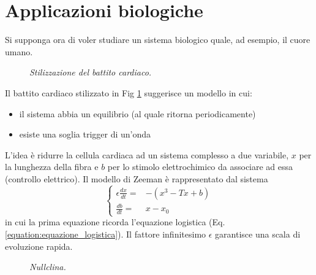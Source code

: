\documentclass[12pt, a4paper]{book}
\theoremstyle{theorem}
\begin{document}
		\section{Applicazioni biologiche}
			Si supponga ora di voler studiare un sistema biologico quale, ad esempio, il cuore umano.
			\begin{figure}[H]
				\centering
				\caption{\emph{Stilizzazione del battito cardiaco.}}
				\label{figure:battito_cardiaco}
			\end{figure}
			Il battito cardiaco stilizzato in Fig \ref{figure:battito_cardiaco} suggerisce un modello in cui:
			\begin{itemize}
				\item il sistema abbia un equilibrio (al quale ritorna periodicamente)
				\item esiste una soglia trigger di un'onda 
			\end{itemize}
			L'idea è ridurre la cellula cardiaca ad un sistema complesso a due variabile, $x$ per la lunghezza della fibra e $b$ per lo stimolo elettrochimico da associare ad essa (controllo elettrico).
			Il modello di Zeeman è rappresentato dal sistema
			\begin{equation}
				\begin{cases}
					\epsilon\frac{dx}{dt}=&-\left(x^3-Tx+b\right)\\
					\frac{db}{dt}=&x-x_{0}
				\end{cases}
			\end{equation}
			in cui la prima equazione ricorda l'equazione logistica (Eq. \ref{equation:equazione_logistica}).
			Il fattore infinitesimo $\epsilon$ garantisce una scala di evoluzione rapida.
			\begin{figure}[H]
				\centering
				\caption{\emph{Nullclina.}}
				\label{figure:nullcline}
			\end{figure}
\end{document}
